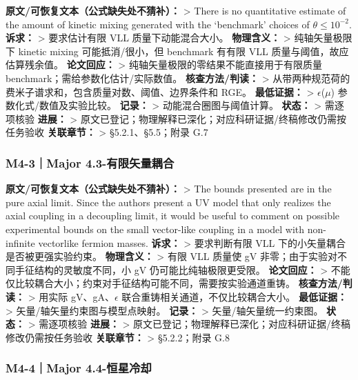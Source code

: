 \documentclass[
  chinese,
  UTF8]{ctexart}
\begin{document}
\textbf{原文/可恢复文本（公式缺失处不猜补）：} \textgreater{} There is
no quantitative estimate of the amount of kinetic mixing generated with
the `benchmark' choices of \(\theta\leq10^{-2}\). \textbf{诉求：}
\textgreater{} 要求估计有限 VLL 质量下动能混合大小。 \textbf{物理含义：}
\textgreater{} 纯轴矢量极限下 kinetic mixing 可能抵消/很小，但 benchmark
有有限 VLL 质量与阈值，故应估算残余值。 \textbf{论文回应：}
\textgreater{} 纯轴矢量极限的零结果不能直接用于有限质量
benchmark；需给参数化估计/实际数值。 \textbf{核查方法/判读：}
\textgreater{}
从带两种规范荷的费米子谱求和，包含质量对数、阈值、边界条件和 RGE。
\textbf{最低证据：} \textgreater{}
\ensuremath{\epsilon}(\ensuremath{\mu}) 参数化式/数值及实验比较。
\textbf{记录：} \textgreater{} 动能混合圈图与阈值计算。 \textbf{状态：}
\textgreater{} 需逐项核验 \textbf{进展：} \textgreater{}
原文已登记；物理解释已深化；对应科研证据/终稿修改仍需按任务验收
\textbf{关联章节：} \textgreater{} §5.2.1、§5.5；附录 G.7

\subsubsection{M4-3｜Major
4.3-有限矢量耦合}\label{m4-3major-4.3-ux6709ux9650ux77e2ux91cfux8026ux5408}

\textbf{原文/可恢复文本（公式缺失处不猜补）：} \textgreater{} The bounds
presented are in the pure axial limit. Since the authors present a UV
model that only realizes the axial coupling in a decoupling limit, it
would be useful to comment on possible experimental bounds on the small
vector-like coupling in a model with non-infinite vectorlike fermion
masses. \textbf{诉求：} \textgreater{} 要求判断有限 VLL
下的小矢量耦合是否被更强实验约束。 \textbf{物理含义：} \textgreater{}
有限 VLL 质量使 gV 非零；由于实验对不同手征结构的灵敏度不同，小 gV
仍可能比纯轴极限更受限。 \textbf{论文回应：} \textgreater{}
不能仅比较耦合大小；约束对手征结构可能不同，需要按实验通道重铸。
\textbf{核查方法/判读：} \textgreater{} 用实际
gV、gA、\ensuremath{\epsilon} 联合重铸相关通道，不仅比较耦合大小。
\textbf{最低证据：} \textgreater{} 矢量/轴矢量约束图与模型点映射。
\textbf{记录：} \textgreater{} 矢量/轴矢量统一约束图。 \textbf{状态：}
\textgreater{} 需逐项核验 \textbf{进展：} \textgreater{}
原文已登记；物理解释已深化；对应科研证据/终稿修改仍需按任务验收
\textbf{关联章节：} \textgreater{} §5.2.2；附录 G.8

\subsubsection{M4-4｜Major
4.4-恒星冷却}\label{m4-4major-4.4-ux6052ux661fux51b7ux5374}
\end{document}

